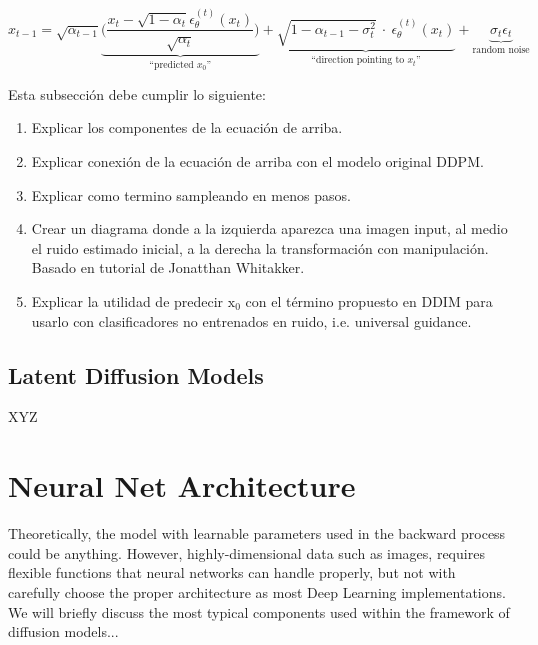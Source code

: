 \begin{equation}\label{eqn:ddim-likelihood}
    x_{t-1} = 
    \sqrt{\alpha_{t-1}}\underbrace{\bigg(\frac{x_{t}-\sqrt{1-\alpha_{t}}\epsilon_{\theta}^{(t)}(x_{t})}{\sqrt{\alpha_{t}}}\bigg)}_{\text{``predicted $x_{0}$''}} 
    + \underbrace{\sqrt{1-\alpha_{t-1} - \sigma^2_{t}}~\cdot~\epsilon_{\theta}^{(t)}(x_{t})}_{\text{``direction pointing to $x_{t}$''}}
    + \underbrace{\sigma_{t}\epsilon_{t}}_{\text{random noise}}
\end{equation}

Esta subsección debe cumplir lo siguiente:

\begin{enumerate}
    \item Explicar los componentes de la ecuación de arriba.
    \item Explicar conexión de la ecuación de arriba con el modelo original DDPM.
    \item Explicar como termino sampleando en menos pasos.
    \item Crear un diagrama donde a la izquierda aparezca una imagen input, al medio el ruido estimado inicial, a la derecha la transformación con
manipulación. Basado en tutorial de Jonatthan Whitakker.
    \item Explicar la utilidad de predecir $\mathrm{x}_{0}$ con el término
    propuesto en DDIM para usarlo con clasificadores no entrenados en ruido, i.e. universal guidance.
\end{enumerate}



\subsection{Latent Diffusion Models}

XYZ

\section{Neural Net Architecture}

Theoretically, the model with learnable parameters used in the backward process could be anything. However, highly-dimensional data such as images, requires flexible functions that neural networks can handle properly, but not with carefully choose the proper architecture as most Deep Learning implementations. We will briefly discuss the most typical components used within the framework of diffusion models...\\

